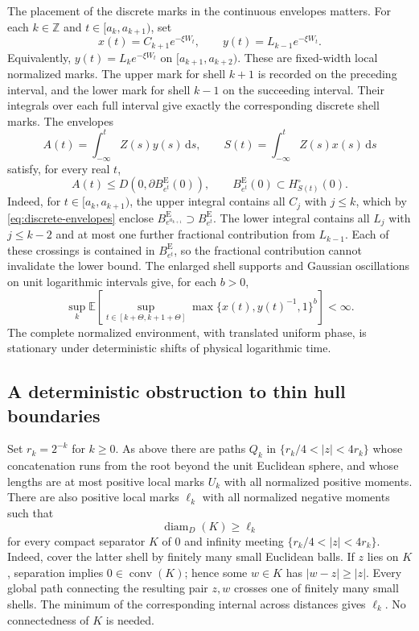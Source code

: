 \documentclass[11pt,reqno]{amsart}
\theoremstyle{plain}
\theoremstyle{definition}
\theoremstyle{remark}
\newcommand{\E}{\mathbb E}
\newcommand{\diam}{\operatorname{diam}}
\newcommand{\1}{\mathbf{1}}
\newcommand{\dd}{\,\mathrm d}
\newcommand{\Be}{B^{\mathrm E}}
\begin{document}
The placement of the discrete marks in the continuous envelopes matters. For each $k\in\mathbb Z$ and $t\in[a_k,a_{k+1})$, set
\[
x(t)=C_{k+1}e^{-\xi W_t},\qquad y(t)=L_{k-1}e^{-\xi W_t}.
\]
Equivalently, $y(t)=L_k e^{-\xi W_t}$ on $[a_{k+1},a_{k+2})$. These are fixed-width local normalized marks. The upper mark for shell $k+1$ is recorded on the preceding interval, and the lower mark for shell $k-1$ on the succeeding interval. Their integrals over each full interval give exactly the corresponding discrete shell marks. The envelopes
\begin{equation}\label{eq:envelopes}
A(t)=\int_{-\infty}^t Z(s)y(s)\dd s,
\qquad S(t)=\int_{-\infty}^t Z(s)x(s)\dd s
\end{equation}
satisfy, for every real $t$,
\begin{equation}\label{eq:envelope-comparisons}
A(t)\le D(0,\partial\Be_{e^t}(0)),\qquad
\Be_{e^t}(0)\subset H_{S(t)}^\circ(0).
\end{equation}
Indeed, for $t\in[a_k,a_{k+1})$, the upper integral contains all $C_j$ with $j\le k$, which by \eqref{eq:discrete-envelopes} enclose $\Be_{e^{a_{k+1}}}\supset\Be_{e^t}$. The lower integral contains all $L_j$ with $j\le k-2$ and at most one further fractional contribution from $L_{k-1}$. Each of these crossings is contained in $\Be_{e^t}$, so the fractional contribution cannot invalidate the lower bound. The enlarged shell supports and Gaussian oscillations on unit logarithmic intervals give, for each $b>0$,
\begin{equation}\label{eq:mark-moments}
\sup_{k}\E\left[\sup_{t\in[k+\Theta,k+1+\Theta]}
\max\{x(t),y(t)^{-1},1\}^{b}\right]<\infty.
\end{equation}
The complete normalized environment, with translated uniform phase, is stationary under deterministic shifts of physical logarithmic time.

\subsection{A deterministic obstruction to thin hull boundaries}\label{subsec:thin}
Set $r_k=2^{-k}$ for $k\ge0$. As above there are paths $Q_k$ in $\{r_k/4<|z|<4r_k\}$ whose concatenation runs from the root beyond the unit Euclidean sphere, and whose lengths are at most positive local marks $U_k$ with all normalized positive moments. There are also positive local marks $\ell_k$ with all normalized negative moments such that
\begin{equation}\label{eq:separator-lower}
\diam_D(K)\ge\ell_k
\end{equation}
for every compact separator $K$ of $0$ and infinity meeting $\{r_k/4<|z|<4r_k\}$. Indeed, cover the latter shell by finitely many small Euclidean balls. If $z$ lies on $K$, separation implies $0\in\operatorname{conv}(K)$; hence some $w\in K$ has $|w-z|\ge|z|$. Every global path connecting the resulting pair $z,w$ crosses one of finitely many small shells. The minimum of the corresponding internal across distances gives $\ell_k$. No connectedness of $K$ is needed.
\end{document}
